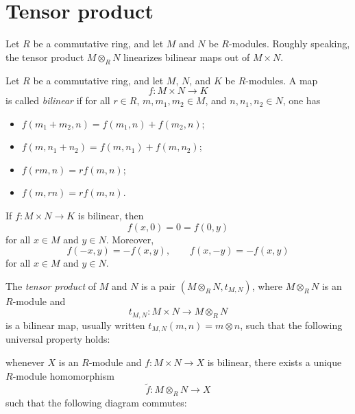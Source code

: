 \section{Tensor product}

Let $R$ be a commutative ring, and let $M$ and $N$ be $R$-modules. Roughly speaking, the tensor product $M \otimes_R N$ linearizes bilinear maps out of $M \times N$.

\begin{definition}
    Let $R$ be a commutative ring, and let $M$, $N$, and $K$ be $R$-modules. A map
    \[
        f\colon M \times N \to K
    \]
    is called \emph{bilinear} if for all $r\in R$, $m,m_1,m_2\in M$, and $n,n_1,n_2\in N$, one has
    \begin{itemize}
        \item $f(m_1+m_2,n) = f(m_1,n) + f(m_2,n)$;
        \item $f(m,n_1+n_2) = f(m,n_1) + f(m,n_2)$;
        \item $f(rm,n) = r f(m,n)$;
        \item $f(m,rn) = r f(m,n)$.
    \end{itemize}
\end{definition}

\begin{example}
    If $f\colon M\times N \to K$ is bilinear, then
    \[
        f(x,0)=0=f(0,y)
    \]
    for all $x\in M$ and $y\in N$. Moreover,
    \[
        f(-x,y)=-f(x,y), \qquad f(x,-y)=-f(x,y)
    \]
    for all $x\in M$ and $y\in N$.
\end{example}

\begin{definition}
    The \emph{tensor product} of $M$ and $N$ is a pair $(M \otimes_R N, t_{M,N})$, where $M \otimes_R N$ is an $R$-module and
    \[
        t_{M,N}\colon M\times N \to M \otimes_R N
    \]
    is a bilinear map, usually written $t_{M,N}(m,n)=m\otimes n$, such that the following universal property holds:

    whenever $X$ is an $R$-module and $f\colon M\times N \to X$ is bilinear, there exists a unique $R$-module homomorphism
    \[
        \tilde{f}\colon M \otimes_R N \to X
    \]
    such that the following diagram commutes:
    \begin{center}
    \end{center}
\end{definition}

